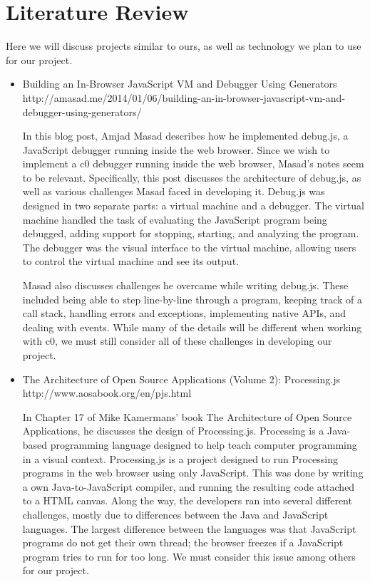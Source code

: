 \documentclass[11pt]{article}
\begin{document}
\section{Literature Review}
\par
Here we will discuss projects similar to ours, as well as technology
we plan to use for our project.
\begin{itemize}
\item Building an In-Browser JavaScript VM and Debugger Using Generators\\
  http://amasad.me/2014/01/06/building-an-in-browser-javascript-vm-and-debugger-using-generators/
  \par
  In this blog post, Amjad Masad describes how he implemented
  debug.js, a JavaScript debugger running inside the web
  browser. Since we wish to implement a c0 debugger running inside the
  web browser, Masad's notes seem to be relevant.  Specifically, this
  post discusses the architecture of debug.js, as well as various
  challenges Masad faced in developing it.  Debug.js was designed in
  two separate parts: a virtual machine and a debugger. The virtual
  machine handled the task of evaluating the JavaScript program being
  debugged, adding support for stopping, starting, and analyzing the
  program. The debugger was the visual interface to the virtual
  machine, allowing users to control the virtual machine and see its
  output.
  \par
  Masad also discusses challenges he overcame while writing
  debug.js. These included being able to step line-by-line through a
  program, keeping track of a call stack, handling errors and
  exceptions, implementing native APIs, and dealing with events. While
  many of the details will be different when working with c0, we must
  still consider all of these challenges in developing our project.

\item The Architecture of Open Source Applications (Volume 2): Processing.js\\
  http://www.aosabook.org/en/pjs.html
  \par
  In Chapter 17 of Mike Kamermans' book The Architecture of Open
  Source Applications, he discusses the design of
  Processing.js. Processing is a Java-based programming language
  designed to help teach computer programming in a visual
  context. Processing.js is a project designed to run Processing
  programs in the web browser using only JavaScript.  This was done by
  writing a own Java-to-JavaScript compiler, and running the resulting
  code attached to a HTML canvas.  Along the way, the developers ran
  into several different challenges, mostly due to differences between
  the Java and JavaScript languages.  The largest difference between
  the languages was that JavaScript programs do not get their own
  thread; the browser freezes if a JavaScript program tries to run for
  too long.  We must consider this issue among others for our project.


\end{itemize}
\end{document}
